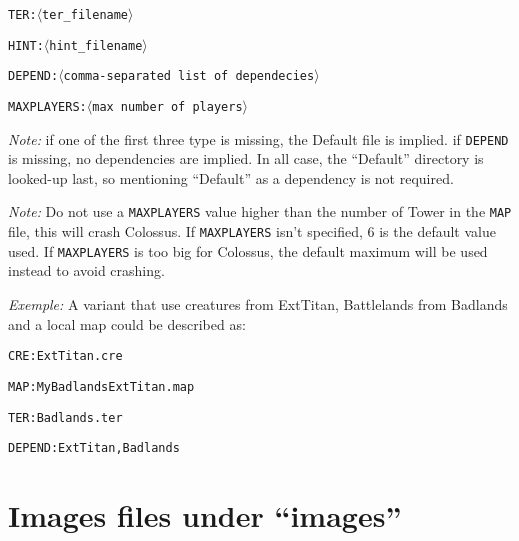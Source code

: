 \documentclass{article}
\begin{document}
\texttt{\texttt{TER}:$\langle$ter\_filename$\rangle$}

\texttt{\texttt{HINT}:$\langle$hint\_filename$\rangle$}

\texttt{\texttt{DEPEND}:$\langle$comma-separated list of dependecies$\rangle$}

\texttt{\texttt{MAXPLAYERS}:$\langle$max number of players$\rangle$}

\textit{Note:} if one of the  first three type is missing, the Default file is implied. if \texttt{DEPEND} is missing, no dependencies are implied. In all case, the ``Default'' directory is looked-up last, so mentioning ``Default'' as a dependency is not required.

\textit{Note:} Do not use a \texttt{MAXPLAYERS} value higher than the number of Tower in the \texttt{MAP} file, this will crash Colossus. If \texttt{MAXPLAYERS} isn't specified, 6 is the default value used. If \texttt{MAXPLAYERS} is too big for Colossus, the default maximum will be used instead to avoid crashing.

\textit{Exemple:} A variant that use creatures from ExtTitan, Battlelands from Badlands and a local map could be described as:

\texttt{\texttt{CRE}:ExtTitan.cre}

\texttt{\texttt{MAP}:MyBadlandsExtTitan.map}

\texttt{\texttt{TER}:Badlands.ter}

\texttt{\texttt{DEPEND}:ExtTitan,Badlands}

\section{Images files under ``images''}
\label{images}
\end{document}
